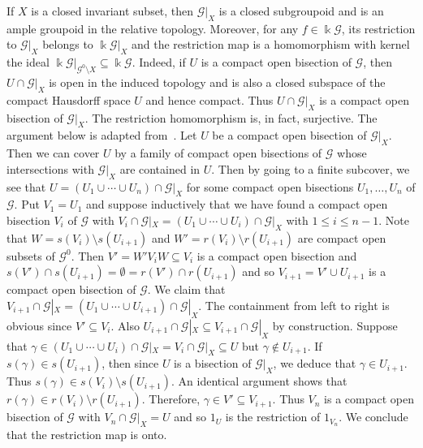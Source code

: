 \documentclass[11pt,reqno]{amsart}
\theoremstyle{plain}
\numberwithin{equation}{section}
\begin{document}
 If $X$ is a closed invariant subset, then $\mathscr G|_X$ is a closed subgroupoid and is an ample groupoid in the relative topology.  Moreover, for any $f\in \Bbbk \mathscr G$, its restriction to $\mathscr G|_X$ belongs to $\Bbbk \mathscr G|_X$ and the restriction map is a homomorphism with kernel the ideal $\Bbbk \mathscr G|_{\mathscr G^0\setminus X}\subseteq \Bbbk \mathscr G$.  Indeed, if $U$ is a compact open bisection of $\mathscr G$, then $U\cap \mathscr G|_X$ is open in the induced topology and is also a closed subspace of the compact Hausdorff space $U$ and hence compact. Thus $U\cap \mathscr G|_X$ is a compact open bisection of $\mathscr G|_X$.  The restriction homomorphism is, in fact, surjective. The argument below is adapted from~\cite[Lemma~5.5]{lawsonvdovina}. Let $U$ be a compact open bisection of $\mathscr G|_X$. Then we can cover $U$ by a family of compact open bisections of $\mathscr G$ whose intersections with $\mathscr G|_X$ are contained in $U$.  Then by going to a finite subcover, we see that $U = (U_1\cup \cdots \cup U_n)\cap \mathscr G|_X$ for some compact open bisections $U_1,\ldots, U_n$ of $\mathscr G$. Put $V_1=U_1$ and suppose inductively that we have found a compact open bisection $V_i$ of $\mathscr G$ with $V_i\cap \mathscr G|_X=(U_1\cup\cdots \cup U_i)\cap \mathscr G|_X$ with $1\leq i\leq n-1$.  Note that $W=s(V_i)\setminus s(U_{i+1})$ and $W' = r(V_i)\setminus r(U_{i+1})$ are compact open subsets of $\mathscr G^0$.  Then $V'=W'V_iW\subseteq V_i$ is a compact open bisection and $s(V')\cap s(U_{i+1})=\emptyset =r(V')\cap r(U_{i+1})$ and so $V_{i+1} =V'\cup U_{i+1}$ is a compact open bisection of $\mathscr G$.  We claim that $V_{i+1}\cap \mathscr G|_X = (U_1\cup\cdots\cup  U_{i+1})\cap \mathscr G|_X$.  The containment from left to right is obvious since $V'\subseteq V_i$.    Also $U_{i+1}\cap \mathscr G|_X\subseteq V_{i+1}\cap \mathscr G|_X$ by construction.  Suppose that $\gamma\in (U_1\cup\cdots \cup U_i)\cap \mathscr G|_X=V_i\cap \mathscr G|_X\subseteq U$ but $\gamma\notin U_{i+1}$.  If $s(\gamma)\in s(U_{i+1})$, then since $U$ is a bisection of $\mathscr G|_X$, we deduce that $\gamma\in U_{i+1}$.  Thus $s(\gamma)\in s(V_i)\setminus s(U_{i+1})$.  An identical argument shows that $r(\gamma)\in r(V_i)\setminus r(U_{i+1})$.  Therefore, $\gamma\in V'\subseteq V_{i+1}$.  Thus $V_n$ is a compact open bisection of $\mathscr G$ with $V_n\cap \mathscr G|_X = U$ and so  $1_U$ is the restriction of $1_{V_n}$. We conclude that the restriction map is onto.
\end{document}
